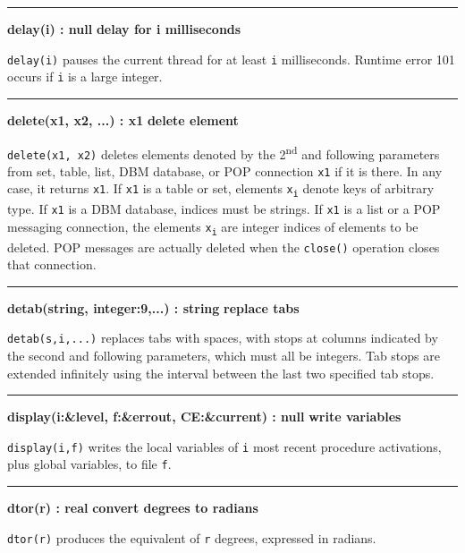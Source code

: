 \bigskip\hrule\vspace{0.1cm}
\noindent
{\bf delay(i) : null } \hfill {\bf delay for i milliseconds}

\noindent
{}\texttt{delay(i)} pauses the current thread for at least
\texttt{i} milliseconds. Runtime error 101 occurs if \texttt{i}
is a large integer.

\bigskip\hrule\vspace{0.1cm}
\noindent
{\bf delete(x1, x2, ...) : x1 } \hfill {\bf delete element}\WarningNotThreadSafe

\noindent
{}\texttt{delete(x1, x2)} deletes elements denoted by the
2\textsuperscript{nd} and following parameters from set, table, list,
DBM database, or POP connection \texttt{x1} if it is there. In any case, it
returns \texttt{x1}. If \texttt{x1} is a table or set, elements
\texttt{x\textsubscript{i}} denote
keys of arbitrary type. If \texttt{x1} is a DBM database, indices must be
strings. If \texttt{x1} is a list or a POP messaging connection,
the elements \texttt{x\textsubscript{i}} are
integer indices of elements to be deleted. POP messages are actually
deleted when the \texttt{close()} operation closes that connection.

\bigskip\hrule\vspace{0.1cm}
\noindent
{\bf detab(string, integer:9,...) : string } \hfill {\bf replace tabs}

\noindent
\texttt{detab(s,i,...)} replaces tabs with spaces, with stops at columns
indicated by the second and following parameters, which must all be
integers. Tab stops are extended infinitely using the interval between
the last two specified tab stops.

\bigskip\hrule\vspace{0.1cm}
\noindent
{\bf display(i:\&level, f:\&errout, CE:\&current) : null } \hfill {\bf write variables}

\noindent
{}\texttt{display(i,f)} writes the local variables
of \texttt{i} most recent procedure activations, plus global
variables, to file \texttt{f}.

\bigskip\hrule\vspace{0.1cm}
\noindent
{\bf dtor(r) : real } \hfill {\bf convert degrees to radians}

\noindent
{}\texttt{dtor(r)}
produces the equivalent of \texttt{r} degrees, expressed in radians.

